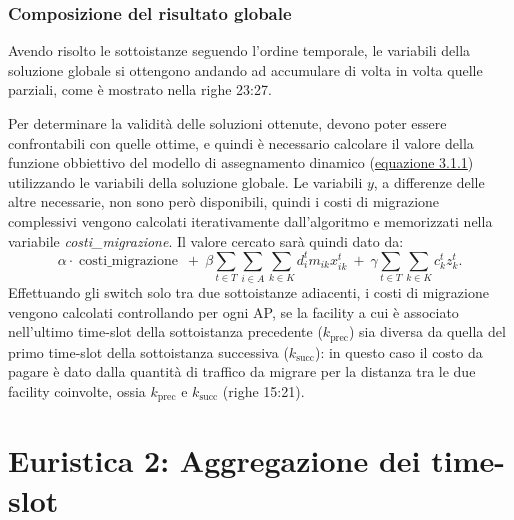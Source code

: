 \subsubsection{Composizione del risultato globale}

Avendo risolto le sottoistanze seguendo l'ordine temporale, le variabili della soluzione globale si ottengono andando ad accumulare di volta in volta quelle parziali, come è mostrato nella righe 23:27.

Per determinare la validità delle soluzioni ottenute, devono poter essere confrontabili con quelle ottime, e quindi è necessario calcolare il valore della funzione obbiettivo del modello di assegnamento dinamico (\hyperref[eq:dinamico-obj]{equazione 3.1.1}) utilizzando le variabili della soluzione globale. Le variabili $y$, a differenze delle altre necessarie, non sono però disponibili, quindi i costi di migrazione complessivi vengono calcolati iterativamente dall'algoritmo e memorizzati nella variabile \textit{costi\_migrazione}. Il valore cercato sarà quindi dato da:
\begin{equation}
    \alpha \cdot \operatorname{costi\_migrazione} ~ + ~ \beta \sum_{t \in T} \sum_{i \in A} \sum_{k \in K}d^{t}_{i} m_{ik} x^t_{ik} ~ + ~ \gamma \sum_{t \in T} \sum_{k \in K}{c_k^t z_k^t}.
\end{equation}
Effettuando gli switch solo tra due sottoistanze adiacenti, i costi di migrazione vengono calcolati controllando per ogni AP, se la facility a cui è associato nell'ultimo time-slot della sottoistanza precedente ($k_{\text{prec}}$) sia diversa da quella del primo time-slot della sottoistanza successiva ($k_{\text{succ}}$): in questo caso il costo da pagare è dato dalla quantità di traffico da migrare per la distanza tra le due facility coinvolte, ossia $k_{\text{prec}}$ e $k_{\text{succ}}$ (righe 15:21).


%
%
\section{Euristica 2: Aggregazione dei time-slot}
\label{sec:aggregamento-time-slot}

